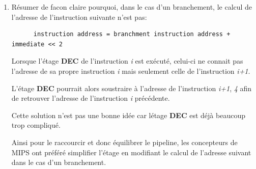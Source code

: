 {\begin{enumerate}
    \begin{correction}

      L'instruction \textit{Andi Rt, Rs, Immed} effectue un \textit{ET logique}
      entre le registre source \textit{Rs} et l'imm\'ediat \textit{Immed}.

      Puis le r\'esultat sur 32-bit est rang\'e dans le registre destination
      \textit{Rt}.

      Pour pouvoir effectuer une op\'eration sur 32-bit les deux op\'erandes
      doivent \^etre sur 32-bit. Dans le cas d'une instruction avec
      un imm\'ediat, ce dernier est \'etendu \`a une valeur sur 32-bit.

      Puisque l'instruction \textit{Andi} est une op\'eration logique
      et non arithm\'etique, l'imm\'ediat sera consid\'er\'e comme
      un nombre non-sign\'e.

      De ce fait les 16 bits de poids forts seront tous simplement
      remplis de z\'eros et l'op\'eration pourra \^etre effectu\'ee
      correctement.

    \end{correction}
  \item
    R\'esumer de facon claire pourquoi, dans le cas d'un branchement,
    le calcul de l'adresse de l'instruction suivante n'est pas:

    \begin{verbatim}
      instruction address = branchment instruction address + immediate << 2
    \end{verbatim}

    \begin{correction}

      Lorsque l'\'etage \textbf{DEC} de l'instruction \textit{i} est
      ex\'ecut\'e, celui-ci ne connait pas l'adresse de sa propre instruction
      \textit{i} mais seulement celle de l'instruction \textit{i+1}.

      L'\'etage \textbf{DEC} pourrait alors soustraire \`a l'adresse de
      l'instruction \textit{i+1}, \textit{4} afin de retrouver l'adresse
      de l'instruction \textit{i} pr\'ec\'edente.

      Cette solution n'est pas une bonne id\'ee car l\'etage \textbf{DEC}
      est d\'ej\`a beaucoup trop compliqu\'e.

      Ainsi pour le raccourcir et donc \'equilibrer le pipeline, les
      concepteurs de MIPS ont pr\'ef\'er\'e simplifier l'\'etage en
      modifiant le calcul de l'adresse suivant dans le cas d'un branchement.


\end{correction}
\end{enumerate}}
